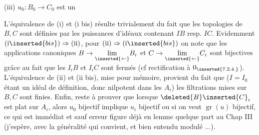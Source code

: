 (iii) $u_0:B_0\to C_0$ est un  

L'équivalence de (i) et (i bis) résulte trivialement du fait que les topologies de $B,C$ sont  définies par les puissances d'idéaux contenant $IB$ resp. $IC$.  Evidemment $(\mathrm i\inserted{bis})\Rightarrow(\mathrm {ii})$, pour $(\mathrm {ii})\Rightarrow(\mathrm i\inserted{bis})$ on note que les applications canoniques $B\to\underset{\inserted{\leftarrow}}{\lim}B_i$ et $C\to\underset{\inserted{\leftarrow}}{\lim}C_i$ sont bijectives grâce au fait que les $I_iB$ et $I_iC$ sont fermés (cf rectification à $0_{\inserted{7.2.4.}}$). L'équivalence de (ii) et (ii bis),  mise pour mémoire, provient du fait que ($I=I_0$ étant un idéal de définition, donc nilpotent dans les $A_i$) les filtrations mises sur $B,C$ sont finies. Enfin, reste à prouver que lorsque  $\deleted{B}\inserted{C}_i$ est plat sur $A_i$, alors $u_0$ bijectif implique $u_i$ bijectif ou si on veut $\operatorname{gr}(u)$ bijectif, ce qui est immédiat et sauf erreur figure déjà en lemme quelque part au Chap III (j'espère, avec la généralité qui convient, et bien entendu modulé ...).


